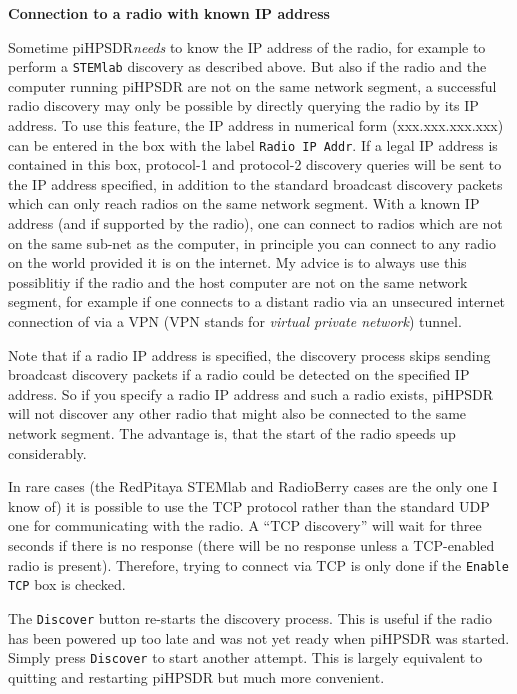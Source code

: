 \documentclass[12pt]{book}
\def\rett#1{\texttt{\color{red}#1}}
\def\pH{pi\-HPSDR\xspace}
\begin{document}
\textbf{Connection to a radio with known IP address}

Sometime \pH \textit{needs} to know the IP address of the radio, for example to perform
a \texttt{STEMlab} discovery as described above. But also if the radio and the computer running
\pH are not on the same network segment, a successful radio discovery may only be possible
by directly querying the radio by its IP address. To use this feature,
the IP address in numerical form (xxx.xxx.xxx.xxx) can be entered in the box
with the label \rett{Radio IP Addr}. If a legal IP address is contained in this box, protocol-1 and
protocol-2 discovery queries
will  be sent to the IP address specified, in addition to the standard broadcast discovery packets which
can only reach
radios on the same network segment. With a known IP address (and if supported by the radio),  one can
connect to radios which are not on the same sub-net as the computer, in principle you can connect to any
radio on the world
provided it is on the internet. My advice is to always use this possiblitiy if the radio and the host
computer are not on the same network segment, for example if one connects to a distant radio via an
unsecured internet connection of via a VPN (VPN stands for \textit{virtual private network}) tunnel.

Note that if a radio IP address is specified, the discovery process skips sending broadcast discovery
packets if a radio could be detected on the specified IP address. So if you specify a radio IP address
and such a radio exists, \pH will not discover any other radio that might also be connected to the same
network segment. The advantage is, that the start of the radio speeds up considerably.

In rare cases (the RedPitaya STEMlab and RadioBerry cases are the only one I know of)
it is  possible to use the TCP protocol
rather than the standard UDP one for communicating with the radio. A ``TCP discovery'' will wait for three
seconds if there is no response (there will be no response unless a TCP-enabled radio is present).
Therefore, trying to connect via TCP is only done if the \rett{Enable TCP} box is checked.



The \rett{Discover} button re-starts the discovery process. This is useful if the radio has been powered up
too late and
was not yet ready when \pH was started. Simply press \rett{Discover} to start another attempt. This is
largely equivalent to quitting and restarting \pH but much more convenient.
\end{document}
